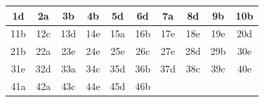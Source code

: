 \begin{table}[h!]
\centering
\begin{tabular}{|c|c|c|c|c|c|c|c|c|c|}
\hline
1d & 2a & 3b & 4b & 5d & 6d & 7a & 8d & 9b & 10b \\ \hline
11b & 12c & 13d & 14e & 15a & 16b & 17e & 18e & 19e & 20d \\ \hline
21b & 22a & 23e & 24e & 25e & 26c & 27e & 28d & 29b & 30e \\ \hline
31e & 32d & 33a & 34c & 35d & 36b & 37d & 38c & 39c & 40e \\ \hline
41a & 42a & 43c & 44e & 45d & 46b &  &  &  &  \\ \hline
\end{tabular}
\end{table}
